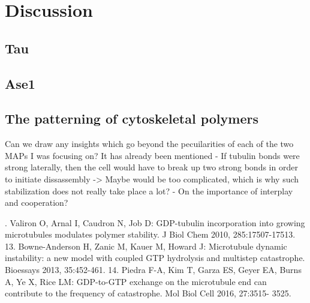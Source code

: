 \chapter{Discussion}
\section{Tau}

\section{Ase1}


\section{The patterning of cytoskeletal polymers}
Can we draw any insights which go beyond the pecuilarities of each of the two MAPs I was focusing on? It has already been mentioned
- If tubulin bonds were strong laterally, then the cell would have to break up two strong bonds in order to initiate dissassembly -> Maybe would be too complicated, which is why such stabilization does not really take place a lot?
- On the importance of interplay and cooperation?

. Valiron O, Arnal I, Caudron N, Job D: GDP-tubulin incorporation
into growing microtubules modulates polymer stability. J Biol
Chem 2010, 285:17507-17513.
13. Bowne-Anderson H, Zanic M, Kauer M, Howard J: Microtubule
dynamic instability: a new model with coupled GTP hydrolysis
and multistep catastrophe. Bioessays 2013, 35:452-461.
14. Piedra F-A, Kim T, Garza ES, Geyer EA, Burns A, Ye X, Rice LM:
GDP-to-GTP exchange on the microtubule end can contribute
to the frequency of catastrophe. Mol Biol Cell 2016, 27:3515-
3525.
